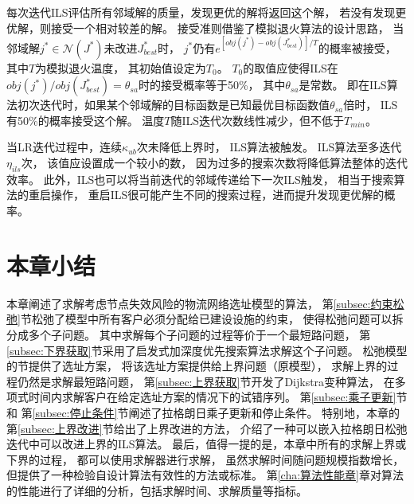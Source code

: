每次迭代ILS评估所有邻域解的质量，发现更优的解将返回这个解，
若没有发现更优解，则接受一个相对较差的解。
接受准则借鉴了模拟退火算法的设计思路\cite{sa}，
当邻域解$j^*\in \mathcal{N}(J^*) $未改进$J^*_{best}$时，
$j^*$仍有$e^{[{obj(j^*)-obj(J^*_{best})}] / T}$的概率被接受，
其中$T$为模拟退火温度，
其初始值设定为$T_0$。
$T_0$的取值应使得ILS在$obj(j^*)/obj(J^*_{best})=\theta_{sa}$时的接受概率等于50\%，
其中$\theta_{sa}$是常数。
即在ILS算法初次迭代时，如果某个邻域解的目标函数是已知最优目标函数值$\theta_{sa}$倍时，
ILS有50\%的概率接受这个解。
温度$T$随ILS迭代次数线性减少，但不低于$T_{min}$。

当LR迭代过程中，连续$\kappa_{ub}$次未降低上界时，
ILS算法被触发。
ILS算法至多迭代$\eta_{ils}$次，
该值应设置成一个较小的数，
因为过多的搜索次数将降低算法整体的迭代效率。
此外，ILS也可以将当前迭代的邻域传递给下一次ILS触发，
相当于搜索算法的重启操作\cite{vrpdst}，
重启ILS很可能产生不同的搜索过程，进而提升发现更优解的概率。


\section{本章小结}
\label{sec:小节4}
本章阐述了求解考虑节点失效风险的物流网络选址模型的算法，
第\ref{subsec:约束松弛}节松弛了模型中所有客户必须分配给已建设设施的约束，
使得松弛问题可以拆分成多个子问题。
其中求解每个子问题的过程等价于一个最短路问题，
第\ref{subsec:下界获取}节采用了启发式加深度优先搜索算法求解这个子问题。
松弛模型的节提供了选址方案，
将该选址方案提供给上界问题（原模型），
求解上界的过程仍然是求解最短路问题，
第\ref{subsec:上界获取}节开发了Dijkstra变种算法，
在多项式时间内求解客户在给定选址方案的情况下的试错序列。
第\ref{subsec:乘子更新}节和
第\ref{subsec:停止条件}节阐述了拉格朗日乘子更新和停止条件。
特别地，本章的第\ref{subsec:上界改进}节给出了上界改进的方法，
介绍了一种可以嵌入拉格朗日松弛迭代中可以改进上界的ILS算法。
最后，值得一提的是，本章中所有的求解上界或下界的过程，
都可以使用求解器进行求解，
虽然求解时间随问题规模指数增长，
但提供了一种检验自设计算法有效性的方法或标准。
第\ref{cha:算法性能章}章对算法的性能进行了详细的分析，包括求解时间、求解质量等指标。
